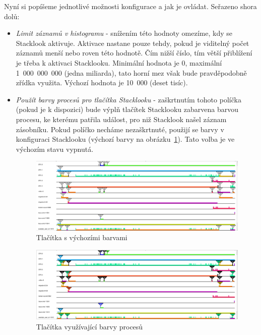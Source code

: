 Nyní si popíšeme jednotlivé možnosti konfigurace a jak je ovládat. Seřazeno shora dolů:
\begin{itemize}
  \item \emph{Limit záznamů v histogramu} - snížením této hodnoty omezíme, kdy se Stacklook aktivuje. Aktivace nastane pouze tehdy, pokud je viditelný počet záznamů menší nebo roven této hodnotě. Čím nižší číslo, tím větší přiblížení je třeba k aktivaci Stacklooku. Minimální hodnota je 0, maximální 1~000~000~000 (jedna miliarda), tato horní mez však bude pravděpodobně zřídka využita. Výchozí hodnota je 10~000 (deset tisíc).
  
  \item \emph{Použít barvy procesů pro tlačítka Stacklooku} - zaškrtnutím tohoto políčka (pokud je k dispozici) bude výplň tlačítek Stacklooku zabarvena barvou procesu, ke kterému patřila událost, pro niž Stacklook našel záznam zásobníku. Pokud políčko necháme nezaškrtnuté, použijí se barvy v konfiguraci Stacklooku (výchozí barvy na obrázku~\ref{SlDefaultColors}). Tato volba je ve výchozím stavu vypnutá.
  
  \begin{figure}[p]\centering
      \includegraphics[width=140mm]{img/Stacklook/SlDefaultColors}
      \caption{Tlačítka s výchozími barvami}
      \label{SlDefaultColors}
  \end{figure}
  
  \begin{figure}[p]\centering
      \includegraphics[width=140mm]{img/Stacklook/SlTaskColors}
      \caption{Tlačítka využívající barvy procesů}
      \label{SlTaskColors}
  \end{figure}


\end{itemize}
